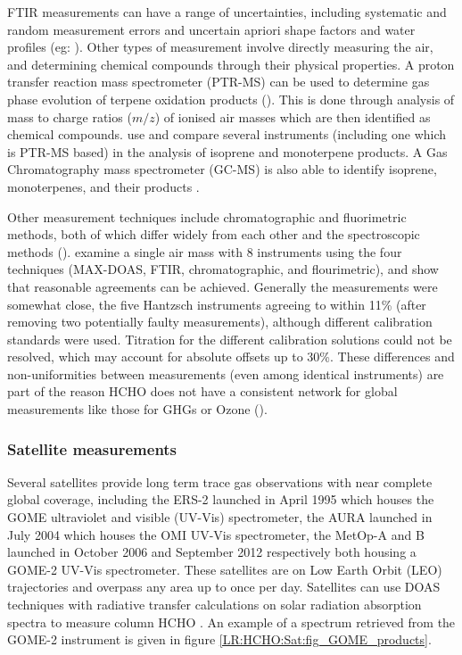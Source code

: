     FTIR measurements can have a range of uncertainties, including systematic and random measurement errors and uncertain apriori shape factors and water profiles (eg: \cite{Franco2015}).
    Other types of measurement involve directly measuring the air, and determining chemical compounds through their physical properties.
    A proton transfer reaction mass spectrometer (PTR-MS) can be used to determine gas phase evolution of terpene oxidation products (\cite[eg.]{Lee2006a,Nguyen2014,Wolfe2016}).
    This is done through analysis of mass to charge ratios ($m/z$) of ionised air masses which are then identified as chemical compounds.
    \cite{Nguyen2014} use and compare several instruments (including one which is PTR-MS based) in the analysis of isoprene and monoterpene products.
    A Gas Chromatography mass spectrometer (GC-MS) is also able to identify isoprene, monoterpenes, and their products \cite[eg.]{Nguyen2014}.
    
    Other measurement techniques include chromatographic and fluorimetric methods, both of which differ widely from each other and the spectroscopic methods (\cite{Hak2005}).
    \cite{Hak2005} examine a single air mass with 8 instruments using the four techniques (MAX-DOAS, FTIR, chromatographic, and flourimetric), and show that reasonable agreements can be achieved.
    Generally the measurements were somewhat close, the five Hantzsch instruments agreeing to within 11\% (after removing two potentially faulty measurements), although different calibration standards were used.
    Titration for the different calibration solutions could not be resolved, which may account for absolute offsets up to 30\%.
    These differences and non-uniformities between measurements (even among identical instruments) are part of the reason HCHO does not have a consistent network for global measurements like those for GHGs or Ozone (\cite{FortemsCheiney2012}).
  
    
  
  \subsubsection{Satellite measurements}
  \label{LR:HCHO:Sat}
    
    Several satellites provide long term trace gas observations with near complete global coverage, including the ERS-2 launched in April 1995 which houses the GOME ultraviolet and visible (UV-Vis) spectrometer, the AURA launched in July 2004 which houses the OMI UV-Vis spectrometer, the MetOp-A and B launched in October 2006 and September 2012 respectively both housing a GOME-2 UV-Vis spectrometer.
    These satellites are on Low Earth Orbit (LEO) trajectories and overpass any area up to once per day.
    Satellites can use DOAS techniques with radiative transfer calculations on solar radiation absorption spectra to measure column HCHO .
    An example of a spectrum retrieved from the GOME-2 instrument is given in figure \ref{LR:HCHO:Sat:fig_GOME_products}.
    
